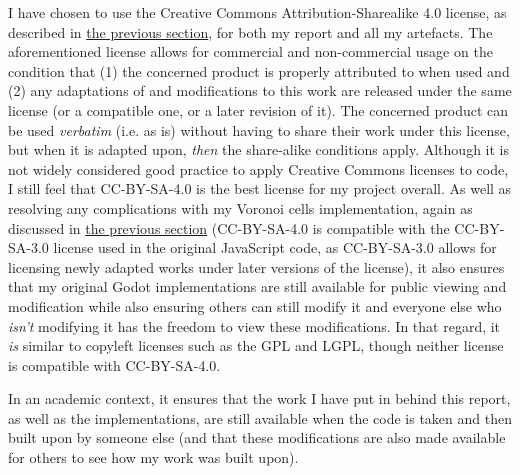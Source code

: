 I have chosen to use the Creative Commons Attribution-Sharealike 4.0 license, as described in \hyperref[howuse]{the previous section}, for both my report and all my artefacts. The aforementioned license allows for commercial and non-commercial usage on the condition that (1) the concerned product is properly attributed to when used and (2) any adaptations of and modifications to this work are released under the same license (or a compatible one, or a later revision of it).\cite{cc_at_sa_4} The concerned product can be used \textit{verbatim} (i.e. as is) without having to share their work under this license, but when it is adapted upon, \textit{then} the share-alike conditions apply. 
Although it is not widely considered good practice to apply Creative Commons licenses to code, I still feel that CC-BY-SA-4.0 is the best license for my project overall. As well as resolving any complications with my Voronoi cells implementation, again as discussed in \hyperref[howuse]{the previous section} (CC-BY-SA-4.0 is compatible with the CC-BY-SA-3.0 license used in the original JavaScript code, as CC-BY-SA-3.0 allows for licensing newly adapted works under later versions of the license\cite{cc_compat}), it also ensures that my original Godot implementations are still available for public viewing and modification while also ensuring others can still modify it and everyone else who \textit{isn't} modifying it has the freedom to view these modifications. In that regard, it \textit{is} similar to copyleft licenses such as the GPL and LGPL, though neither license is compatible with CC-BY-SA-4.0.

In an academic context, it ensures that the work I have put in behind this report, as well as the implementations, are still available when the code is taken and then built upon by someone else (and that these modifications are also made available for others to see how my work was built upon).
